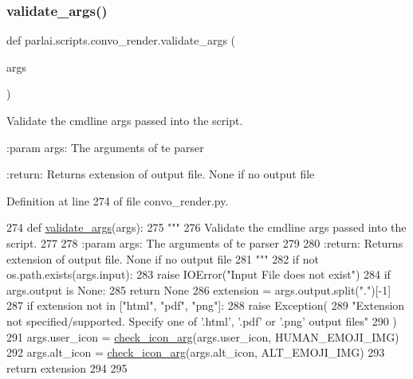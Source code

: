 \subsubsection{\texorpdfstring{validate\+\_\+args()}{validate\_args()}}
{\footnotesize\ttfamily def parlai.\+scripts.\+convo\+\_\+render.\+validate\+\_\+args (\begin{DoxyParamCaption}\item[{}]{args }\end{DoxyParamCaption})}

\begin{DoxyVerb}Validate the cmdline args passed into the script.

:param args: The arguments of te parser

:return: Returns extension of output file. None if no output file
\end{DoxyVerb}
 

Definition at line 274 of file convo\+\_\+render.\+py.


\begin{DoxyCode}
274 \textcolor{keyword}{def }\hyperlink{namespaceparlai_1_1scripts_1_1convo__render_a4078a037f4f5526297e7860fbed9cfb2}{validate\_args}(args):
275     \textcolor{stringliteral}{"""}
276 \textcolor{stringliteral}{    Validate the cmdline args passed into the script.}
277 \textcolor{stringliteral}{}
278 \textcolor{stringliteral}{    :param args: The arguments of te parser}
279 \textcolor{stringliteral}{}
280 \textcolor{stringliteral}{    :return: Returns extension of output file. None if no output file}
281 \textcolor{stringliteral}{    """}
282     \textcolor{keywordflow}{if} \textcolor{keywordflow}{not} os.path.exists(args.input):
283         \textcolor{keywordflow}{raise} IOError(\textcolor{stringliteral}{"Input File does not exist"})
284     \textcolor{keywordflow}{if} args.output \textcolor{keywordflow}{is} \textcolor{keywordtype}{None}:
285         \textcolor{keywordflow}{return} \textcolor{keywordtype}{None}
286     extension = args.output.split(\textcolor{stringliteral}{"."})[-1]
287     \textcolor{keywordflow}{if} extension \textcolor{keywordflow}{not} \textcolor{keywordflow}{in} [\textcolor{stringliteral}{"html"}, \textcolor{stringliteral}{"pdf"}, \textcolor{stringliteral}{"png"}]:
288         \textcolor{keywordflow}{raise} Exception(
289             \textcolor{stringliteral}{"Extension not specified/supported. Specify one of '.html', '.pdf' or '.png' output files"}
290         )
291     args.user\_icon = \hyperlink{namespaceparlai_1_1scripts_1_1convo__render_ac7e3c84a7f6e3b488360319b597eda18}{check\_icon\_arg}(args.user\_icon, HUMAN\_EMOJI\_IMG)
292     args.alt\_icon = \hyperlink{namespaceparlai_1_1scripts_1_1convo__render_ac7e3c84a7f6e3b488360319b597eda18}{check\_icon\_arg}(args.alt\_icon, ALT\_EMOJI\_IMG)
293     \textcolor{keywordflow}{return} extension
294 
295 
\end{DoxyCode}


